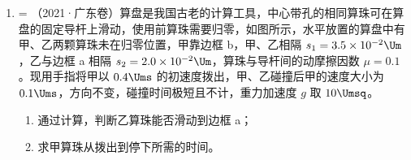 \documentclass[\gkver]{gaokaozhenti}
\makeatletter
\newcommand{\tiinfo}[2]{{\small\color{gray}（#1）\textcolor{orange!85!black}{\nandu{#2}}}\hspace{0.4em}}
\newenvironment{tibody}
  {\begin{minipage}[t]{\linewidth}\@listdepth=\@ne\leavevmode\ignorespaces}
  {\end{minipage}}
\makeatother
\begin{document}
\begin{enumerate}[resume=tiku]
{（2）设 A 车的质量为 $m_{A}$，碰后加速度大小为 $a_{A}$，由牛顿第二定律得 $\mu m_{A}g=m_{A}a_{A}$④，设碰撞后瞬间 A 车速度的大小为 $v_{A}'$，碰撞后滑行的距离为 $s_{A}$，由运动学公式得 $v_{A}'^{2}=2a_{A}s_{A}$⑤，设碰撞前的瞬间 A 车速度的大小为 $v_{A}$。两车在碰撞过程中动量守恒，有 $m_{A}v_{A}=m_{A}v_{A}'+m_{B}v_{B}'$⑥，联立③④⑤⑥式并利用题给数据得 $v_{A}=4.3\Ums$⑦。
}

\item
\begin{tibody}
\tiinfo{2021·广东卷}{2}算盘是我国古老的计算工具，中心带孔的相同算珠可在算盘的固定导杆上滑动，使用前算珠需要归零，如图所示，水平放置的算盘中有甲、乙两颗算珠未在归零位置，甲靠边框 b，甲、乙相隔 $s_{1}=3.5\times10^{-2}\Um$，乙与边框 a 相隔 $s_{2}=2.0\times10^{-2}\Um$，算珠与导杆间的动摩擦因数 $\mu=0.1$。现用手指将甲以 $0.4\Ums$ 的初速度拨出，甲、乙碰撞后甲的速度大小为 $0.1\Ums$，方向不变，碰撞时间极短且不计，重力加速度 $g$ 取 $10\Umsq$。

\begin{enumerate}
	\item
	通过计算，判断乙算珠能否滑动到边框 a；

	\item
	求甲算珠从拨出到停下所需的时间。
\end{enumerate}

\end{tibody}

\end{enumerate}
\end{document}
